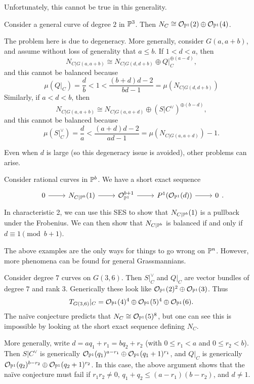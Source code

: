 \documentclass{article}
\begin{document}
Unfortunately, this cannot be true in this generality.

\begin{ex}
	Consider a general curve of degree $2$ in $\mathbb{P}^3$.
	Then $N_C \cong \mathcal{O}_{\mathbb{P}^1}(2) \oplus \mathcal{O}_{\mathbb{P}^1}(4)$.
\end{ex}

The problem here is due to degeneracy.
More generally, consider $G(a, a+b)$, and assume without loss of generality that $a \leq b$.
If $1 < d < a$, then
\[
	N_{C|G(a,a+b)} \cong N_{C|G(d,d+b)} \oplus Q|_C^{\oplus (a - d)},
\]
and this cannot be balanced because 
\[
	\mu(Q|_C) = \frac{d}{b} < 1 < \frac{(b+d) d - 2}{bd - 1} = \mu(N_{C|G(d,d+b)})
\]
Similarly, if $a < d < b$, then
\[
	N_{C|G(a,a+b)} \cong N_{C|G(a,a+d)} \oplus (S|C^\vee)^{\oplus (b - d)},
\]
and this cannot be balanced because
\[
	\mu(S|_C^\vee) = \frac{d}{a} < \frac{(a+d) d - 2}{ad - 1} = \mu(N_{C|G(a,a+d)}) - 1.
\]

Even when $d$ is large (so this degeneracy issue is avoided), other problems can arise.

\begin{ex}
	Consider rational curves in $\mathbb{P}^b$.
	We have a short exact sequence
	\[
		\SES{N_{C|\PP^b}(1)}{\Oc_{\PP^1}^{b+1}}{P^1(\Oc_{\PP^1}(d))}.
	\]
	In characteristic 2, we can use this SES to show that $N_{C|\mathbb{P}^b}(1)$ is a pullback under the Frobenius.
	We can then show that $N_{C|\mathbb{P}^b}$ is balanced if and only if $d \equiv 1 \pmod{b+1}$.
\end{ex}

The above examples are the only ways for things to go wrong on $\mathbb{P}^n$.
However, more phenomena can be found for general Grassmannians.

\begin{ex}
	Consider degree $7$ curves on $G(3, 6)$.
	Then $S|_C^\vee$ and $Q|_C$ are vector bundles of degree $7$ and rank $3$.
	Generically these look like $\mathcal{O}_{\mathbb{P}^1}(2)^2 \oplus \mathcal{O}_{\mathbb{P}^1}(3)$.
	Thus 
	\[
		T_{G(3,6)}|_C = \mathcal{O}_{\mathbb{P}^1}(4)^4 \oplus \mathcal{O}_{\mathbb{P}^1}(5)^4 \oplus \mathcal{O}_{\mathbb{P}^1}(6).
	\]
	The na\"ive conjecture predicts that $N_C \cong \mathcal{O}_{\mathbb{P}^1}(5)^8$, but one can see this is impossible by looking at the short exact sequence defining $N_C$.
\end{ex}

More generally, write $d = aq_1 + r_1 = bq_2 + r_2$ (with $0 \leq r_1 < a$ and $0 \leq r_2 < b$).
Then $S|C^\vee$ is generically $\mathcal{O}_{\mathbb{P}^1}(q_1)^{a-r_1} \oplus \mathcal{O}_{\mathbb{P}^1}(q_1 + 1)^{r_1}$, and $Q|_C$ is generically $\mathcal{O}_{\mathbb{P}^1}(q_2)^{b-r_2} \oplus \mathcal{O}_{\mathbb{P}^1}(q_2 + 1)^{r_2}$.
In this case, the above argument shows that the na\"ive conjecture must fail if $r_1 r_2 \neq 0$, $q_1 + q_2 \leq (a - r_1) (b - r_2)$, and $d \neq 1$.
\end{document}
